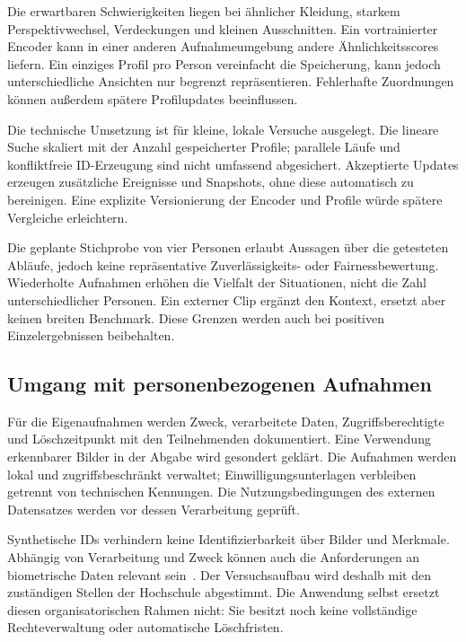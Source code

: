\documentclass[runningheads]{llncs}
\begin{document}
Die erwartbaren Schwierigkeiten liegen bei ähnlicher Kleidung, starkem Perspektivwechsel, Verdeckungen und kleinen Ausschnitten. Ein vortrainierter Encoder kann in einer anderen Aufnahmeumgebung andere Ähnlichkeitsscores liefern. Ein einziges Profil pro Person vereinfacht die Speicherung, kann jedoch unterschiedliche Ansichten nur begrenzt repräsentieren. Fehlerhafte Zuordnungen können au{\ss}erdem spätere Profilupdates beeinflussen.

Die technische Umsetzung ist für kleine, lokale Versuche ausgelegt. Die lineare Suche skaliert mit der Anzahl gespeicherter Profile; parallele Läufe und konfliktfreie ID-Erzeugung sind nicht umfassend abgesichert. Akzeptierte Updates erzeugen zusätzliche Ereignisse und Snapshots, ohne diese automatisch zu bereinigen. Eine explizite Versionierung der Encoder und Profile würde spätere Vergleiche erleichtern.

Die geplante Stichprobe von vier Personen erlaubt Aussagen über die getesteten Abläufe, jedoch keine repräsentative Zuverlässigkeits- oder Fairnessbewertung. Wiederholte Aufnahmen erhöhen die Vielfalt der Situationen, nicht die Zahl unterschiedlicher Personen. Ein externer Clip ergänzt den Kontext, ersetzt aber keinen breiten Benchmark. Diese Grenzen werden auch bei positiven Einzelergebnissen beibehalten.

\subsection{Umgang mit personenbezogenen Aufnahmen}
\label{sec:privacy}

Für die Eigenaufnahmen werden Zweck, verarbeitete Daten, Zugriffsberechtigte und Löschzeitpunkt mit den Teilnehmenden dokumentiert. Eine Verwendung erkennbarer Bilder in der Abgabe wird gesondert geklärt. Die Aufnahmen werden lokal und zugriffsbeschränkt verwaltet; Einwilligungsunterlagen verbleiben getrennt von technischen Kennungen. Die Nutzungsbedingungen des externen Datensatzes werden vor dessen Verarbeitung geprüft.

Synthetische IDs verhindern keine Identifizierbarkeit über Bilder und Merkmale. Abhängig von Verarbeitung und Zweck können auch die Anforderungen an biometrische Daten relevant sein~\cite{gdpr,edpb-video}. Der Versuchsaufbau wird deshalb mit den zuständigen Stellen der Hochschule abgestimmt. Die Anwendung selbst ersetzt diesen organisatorischen Rahmen nicht: Sie besitzt noch keine vollständige Rechteverwaltung oder automatische Löschfristen.
\end{document}
